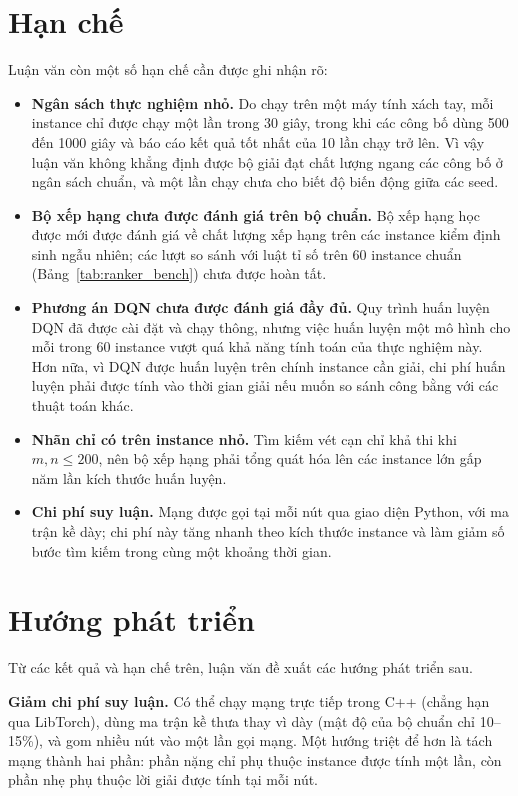 \section{Hạn chế}

Luận văn còn một số hạn chế cần được ghi nhận rõ:
\begin{itemize}
  \item \textbf{Ngân sách thực nghiệm nhỏ.} Do chạy trên một máy tính xách tay, mỗi instance chỉ được chạy một lần trong 30 giây, trong khi các công bố dùng 500 đến 1000 giây và báo cáo kết quả tốt nhất của 10 lần chạy trở lên. Vì vậy luận văn không khẳng định được bộ giải đạt chất lượng ngang các công bố ở ngân sách chuẩn, và một lần chạy chưa cho biết độ biến động giữa các seed.
  \item \textbf{Bộ xếp hạng chưa được đánh giá trên bộ chuẩn.} Bộ xếp hạng học được mới được đánh giá về chất lượng xếp hạng trên các instance kiểm định sinh ngẫu nhiên; các lượt so sánh với luật tỉ số trên 60 instance chuẩn (Bảng~\ref{tab:ranker_bench}) chưa được hoàn tất.
  \item \textbf{Phương án DQN chưa được đánh giá đầy đủ.} Quy trình huấn luyện DQN đã được cài đặt và chạy thông, nhưng việc huấn luyện một mô hình cho mỗi trong 60 instance vượt quá khả năng tính toán của thực nghiệm này. Hơn nữa, vì DQN được huấn luyện trên chính instance cần giải, chi phí huấn luyện phải được tính vào thời gian giải nếu muốn so sánh công bằng với các thuật toán khác.
  \item \textbf{Nhãn chỉ có trên instance nhỏ.} Tìm kiếm vét cạn chỉ khả thi khi $m,n\le200$, nên bộ xếp hạng phải tổng quát hóa lên các instance lớn gấp năm lần kích thước huấn luyện.
  \item \textbf{Chi phí suy luận.} Mạng được gọi tại mỗi nút \addstar qua giao diện Python, với ma trận kề dày; chi phí này tăng nhanh theo kích thước instance và làm giảm số bước tìm kiếm trong cùng một khoảng thời gian.
\end{itemize}

\section{Hướng phát triển}

Từ các kết quả và hạn chế trên, luận văn đề xuất các hướng phát triển sau.

\textbf{Giảm chi phí suy luận.} Có thể chạy mạng trực tiếp trong C++ (chẳng hạn qua LibTorch), dùng ma trận kề thưa thay vì dày (mật độ của bộ chuẩn chỉ 10--15\%), và gom nhiều nút \addstar vào một lần gọi mạng. Một hướng triệt để hơn là tách mạng thành hai phần: phần nặng chỉ phụ thuộc instance được tính một lần, còn phần nhẹ phụ thuộc lời giải được tính tại mỗi nút.

